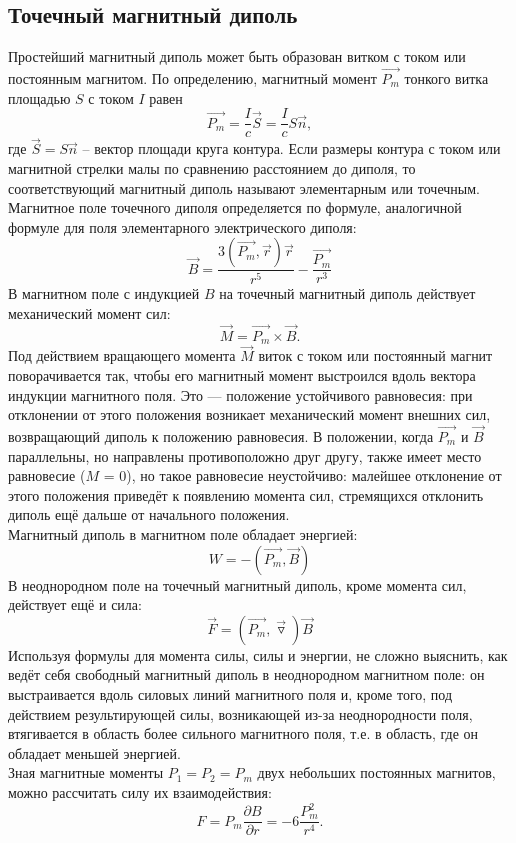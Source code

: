 \subsection*{Точечный магнитный диполь}
Простейший магнитный диполь может быть образован витком с током или постоянным магнитом. По определению, магнитный момент $\overrightarrow{P_m}$ тонкого витка площадью $S$ с током $I$ равен
$$
\overrightarrow{P_m}=\dfrac{I}{c}\vec{S}=\dfrac{I}{c}S\vec{n},
$$
где $\vec{S}=S\vec{n}$ -- вектор площади круга контура. Если размеры контура с током или магнитной стрелки малы по сравнению расстоянием до диполя, то соответствующий магнитный диполь называют элементарным или точечным.\\
Магнитное поле точечного диполя определяется по формуле, аналогичной формуле для поля
элементарного электрического диполя:
$$
\vec{B}=\dfrac{3(\overrightarrow{P_m},\vec{r})\vec{r}}{r^5} - \dfrac{\overrightarrow{P_m}}{r^3}
$$ 
В магнитном поле с индукцией $B$
на точечный магнитный диполь 
действует механический
момент сил:
$$
\vec{M} = \overrightarrow{P_m}\times \vec{B}.
$$
Под действием вращающего момента $\vec{M}$ виток с током или постоянный магнит поворачивается
так, чтобы его магнитный момент выстроился вдоль вектора индукции магнитного поля. Это —
положение устойчивого равновесия: при отклонении от этого положения возникает механический
момент внешних сил, возвращающий диполь к положению равновесия. В положении, когда $\overrightarrow{P_m}$ и $\vec{B}$
параллельны, но направлены противоположно друг другу, также имеет место равновесие ($M$ = 0),
но такое равновесие неустойчиво: малейшее отклонение от этого положения приведёт к появлению
момента сил, стремящихся отклонить диполь ещё дальше от начального положения.\\
Магнитный диполь в магнитном поле обладает энергией:
$$
W = -(\overrightarrow{P_m},\vec{B})
$$
В неоднородном поле на точечный магнитный диполь, кроме момента сил, действует ещё и сила:
$$
\vec{F}=(\overrightarrow{P_m},\vec{\triangledown})\vec{B}
$$
Используя формулы для момента силы, силы и энергии, не сложно выяснить, как ведёт себя
свободный магнитный диполь в неоднородном магнитном поле: он выстраивается вдоль силовых
линий магнитного поля и, кроме того, под действием результирующей силы, возникающей из-за
неоднородности поля, втягивается в область более сильного магнитного поля, т.е. в область, где он
обладает меньшей энергией.\\
Зная магнитные моменты $P_1 = P_2 = P_m$ двух небольших постоянных магнитов, можно рассчитать силу
их взаимодействия:
$$
F = P_m \dfrac{\partial B}{\partial r}=-6\dfrac{P_m^2}{r^4}.
$$
